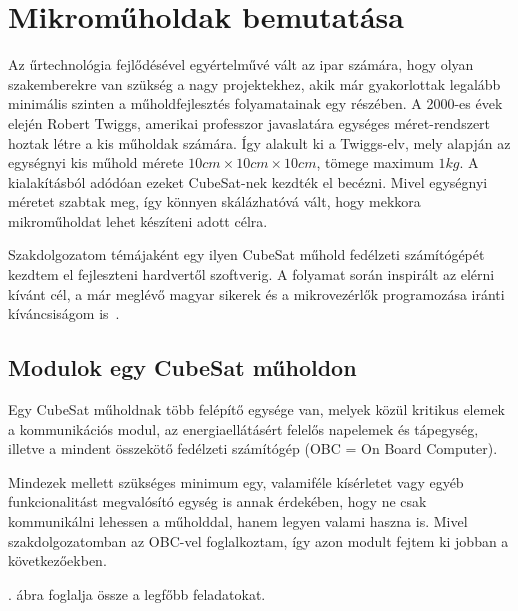 \section{Mikroműholdak bemutatása}
Az űrtechnológia fejlődésével egyértelművé vált az ipar számára, hogy olyan szakemberekre van szükség a nagy projektekhez, akik már gyakorlottak legalább minimális szinten a műholdfejlesztés folyamatainak egy részében. A 2000-es évek elején Robert Twiggs, amerikai professzor javaslatára egységes méret-rendszert hoztak létre a kis műholdak számára. Így alakult ki a Twiggs-elv, mely alapján az egységnyi kis műhold mérete $10cm\times10cm\times10cm$, tömege maximum $1kg$. A kialakításból adódóan ezeket CubeSat-nek kezdték el becézni. Mivel egységnyi méretet szabtak meg, így könnyen skálázhatóvá vált, hogy mekkora mikroműholdat lehet készíteni adott célra.

Szakdolgozatom témájaként egy ilyen CubeSat műhold fedélzeti számítógépét kezdtem el fejleszteni hardvertől szoftverig. A folyamat során inspirált az elérni kívánt cél, a már meglévő magyar sikerek és a mikrovezérlők programozása iránti kíváncsiságom is~\cite{masat-origo}.

\subsection{Modulok egy CubeSat műholdon}
Egy CubeSat műholdnak több felépítő egysége van, melyek közül kritikus elemek a kommunikációs modul, az energiaellátásért felelős napelemek és tápegység, illetve a mindent összekötő fedélzeti számítógép (OBC = On Board Computer).

Mindezek mellett szükséges minimum egy, valamiféle kísérletet vagy egyéb funkcionalitást megvalósító egység is annak érdekében, hogy ne csak kommunikálni lehessen a műholddal, hanem 
legyen valami haszna is. %
Mivel szakdolgozatomban az OBC-vel foglalkoztam, így azon modult fejtem ki jobban a következőekben.


. ábra foglalja össze a legfőbb feladatokat.

